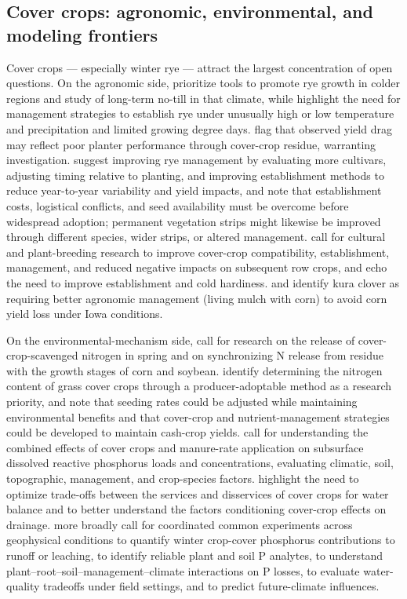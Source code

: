\documentclass[11pt]{article}
\begin{document}
\subsection{Cover crops: agronomic, environmental, and modeling frontiers}

Cover crops --- especially winter rye --- attract the largest concentration of open questions. On the agronomic side, \textcite{Waring2020} prioritize tools to promote rye growth in colder regions and study of long-term no-till in that climate, while \textcite{Bawa2023} highlight the need for management strategies to establish rye under unusually high or low temperature and precipitation and limited growing degree days. \textcite{Dougherty2020} flag that observed yield drag may reflect poor planter performance through cover-crop residue, warranting investigation. \textcite{Kaspar2007} suggest improving rye management by evaluating more cultivars, adjusting timing relative to planting, and improving establishment methods to reduce year-to-year variability and yield impacts, and note that establishment costs, logistical conflicts, and seed availability must be overcome before widespread adoption; permanent vegetation strips might likewise be improved through different species, wider strips, or altered management. \textcite{Dinnes2002} call for cultural and plant-breeding research to improve cover-crop compatibility, establishment, management, and reduced negative impacts on subsequent row crops, and \textcite{Liu2019} echo the need to improve establishment and cold hardiness. \textcite{Qi2011b} and \textcite{Qi2011} identify kura clover as requiring better agronomic management (living mulch with corn) to avoid corn yield loss under Iowa conditions.

On the environmental-mechanism side, \textcite{Lacey2015} call for research on the release of cover-crop-scavenged nitrogen in spring and on synchronizing N release from residue with the growth stages of corn and soybean. \textcite{Roth2018} identify determining the nitrogen content of grass cover crops through a producer-adoptable method as a research priority, and note that seeding rates could be adjusted while maintaining environmental benefits and that cover-crop and nutrient-management strategies could be developed to maintain cash-crop yields. \textcite{Askar2023} call for understanding the combined effects of cover crops and manure-rate application on subsurface dissolved reactive phosphorus loads and concentrations, evaluating climatic, soil, topographic, management, and crop-species factors. \textcite{Meyer2019} highlight the need to optimize trade-offs between the services and disservices of cover crops for water balance and to better understand the factors conditioning cover-crop effects on drainage. \textcite{Liu2019} more broadly call for coordinated common experiments across geophysical conditions to quantify winter crop-cover phosphorus contributions to runoff or leaching, to identify reliable plant and soil P analytes, to understand plant--root--soil--management--climate interactions on P losses, to evaluate water-quality tradeoffs under field settings, and to predict future-climate influences.
\end{document}
